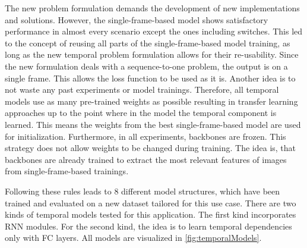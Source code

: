 The new problem formulation demands the development of new implementations and solutions.
However, the single-frame-based model shows satisfactory performance in almost every scenario except the ones including switches.
This led to the concept of reusing all parts of the single-frame-based model training, as long as the new temporal problem formulation allows for their re-usability.
Since the new formulation deals with a sequence-to-one problem, the output is on a single frame. This allows the loss function to be used as it is.
Another idea is to not waste any past experiments or model trainings.
Therefore, all temporal models use as many pre-trained weights as possible resulting in transfer learning approaches up to the point where in the model the temporal component is learned.
This means the weights from the best single-frame-based model are used for initialization.
Furthermore, in all experiments, backbones are frozen.
This strategy does not allow weights to be changed during training.
The idea is, that backbones are already trained to extract the most relevant features of images from single-frame-based trainings.

Following these rules leads to 8 different model structures, which have been trained and evaluated on a new dataset tailored for this use case.
There are two kinds of temporal models tested for this application.
The first kind incorporates \ac{RNN} modules.
For the second kind, the idea is to learn temporal dependencies only with \ac{FC} layers.
All models are visualized in \autoref{fig:temporalModels}.

